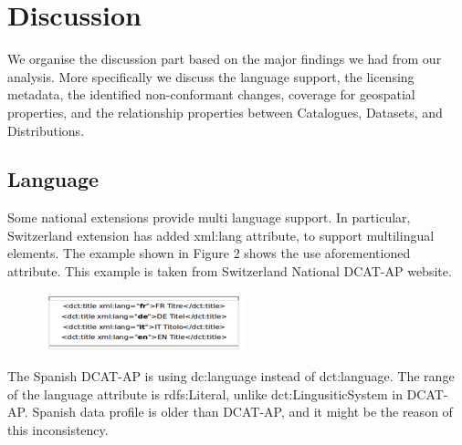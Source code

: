 \documentclass[<options>]{elsarticle}
\begin{document}
\section{Discussion}
We organise the discussion part based on the major findings we had from our analysis. More specifically we discuss the language support, the licensing metadata, the identified non-conformant changes, coverage for geospatial properties, and the relationship properties between Catalogues, Datasets, and Distributions.

\subsection{Language}
Some national extensions provide multi language support. In particular, Switzerland extension has added xml:lang attribute, to support multilingual elements. The example shown in Figure 2 shows the use aforementioned attribute. This example is taken from Switzerland National DCAT-AP website.

\begin{figure}[H]
\includegraphics{replace26.png}
\end{figure}

The Spanish DCAT-AP is using dc:language instead of  dct:language. The range of the language attribute is rdfs:Literal, unlike dct:LingusiticSystem in DCAT-AP. Spanish data profile is older than DCAT-AP, and it might be the reason of this inconsistency.  
\end{document}
